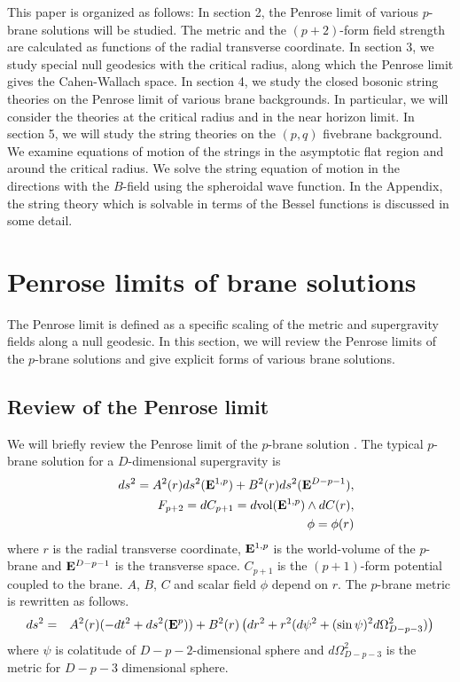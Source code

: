 \documentclass[a4paper,12pt]{article}
\begin{document}
This paper is organized as follows:
In section 2, the Penrose limit of various $p$-brane solutions will be
studied.
The metric and  the $(p+2)$-form field strength 
are calculated as functions of the radial 
transverse coordinate.
In section 3, we study special null geodesics 
with the critical radius,
along which the Penrose limit gives the Cahen-Wallach space.
In section 4, we study the closed bosonic string theories on the
Penrose limit of various brane backgrounds.
In particular, we will consider the theories at the critical radius 
and in the near horizon limit.
In section 5, we will study the string theories on the $(p,q)$
fivebrane background. 
We examine equations of motion of the strings 
in the asymptotic flat region and around the critical radius.
We solve the string equation of motion in the directions with the $B$-field
using the spheroidal wave function.
In the Appendix, the string theory which is solvable in terms of the Bessel 
functions is discussed in some detail.



\section{Penrose limits of brane solutions}   

The Penrose limit is defined as a specific scaling of the metric and 
supergravity fields along a null geodesic.
In this section, we will review the Penrose limits of 
the $p$-brane solutions and give explicit forms of various brane solutions.

\subsection{Review of the Penrose limit}

We will briefly review the Penrose limit of the 
$p$-brane solution \cite{BlFiPa}.
The typical $p$-brane solution for a $D$-dimensional supergravity is 
\begin{eqnarray}
&&ds^2=A^2(r)ds^2({\bf E}^{1,p})+B^2(r)ds^2({\bf E}^{D-p-1}), \nonumber \\
&&F_{p+2}=dC_{p+1}=d{\rm  vol}({\bf E}^{1,p})\wedge dC(r), \nonumber \\
&&\phi=\phi(r)
\label{p-brane solution}
\end{eqnarray}
where $r$ is the radial transverse coordinate, ${\bf E}^{1,p}$ is the 
world-volume of the $p$-brane and ${\bf E}^{D-p-1}$ is the transverse space. 
$C_{p+1}$ is the $(p+1)$-form potential coupled to the brane.
$A$, $B$, $C$ and scalar field $\phi$ depend on $r$.
The $p$-brane metric is rewritten as follows.
\begin{eqnarray}
ds^2&=&A^2(r)(-dt^2+ds^2({\bf E}^p))
+B^2(r)\left(dr^2+r^2(d\psi^2+(\sin\psi)^2d\Omega^2_{D-p-3})\right)
\label{p-brane metric}
\end{eqnarray}
where $\psi$ is colatitude of $D-p-2$-dimensional sphere 
and $d\Omega^2_{D-p-3}$ is the metric for $D-p-3$ dimensional sphere.
\end{document}
